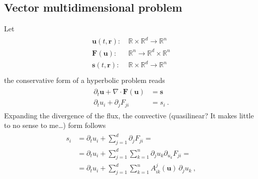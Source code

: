 \documentclass[letterpaper,10pt,english]{jupyterBook}
\begin{document}
\subsection{Vector multi\sphinxhyphen{}dimensional problem}
\label{\detokenize{ch/pde/characteristics:vector-multi-dimensional-problem}}
\sphinxAtStartPar
{} 

\sphinxAtStartPar
Let
\begin{equation*}
\begin{split}\begin{aligned}
  \mathbf{u}(t, \mathbf{r}): & \ \mathbb{R} \times \mathbb{R}^d \rightarrow \mathbb{R}^n \\
  \mathbf{F}(   \mathbf{u}): & \ \mathbb{R}^{n} \rightarrow \mathbb{R}^{d} \times \mathbb{R}^n \\
  \mathbf{s}(t, \mathbf{r}): & \ \mathbb{R} \times \mathbb{R}^d \rightarrow \mathbb{R}^n \\
\end{aligned}\end{split}
\end{equation*}
\sphinxAtStartPar
the conservative form of a hyperbolic problem reads
\begin{equation*}
\begin{split}\begin{aligned}
  \partial_t \mathbf{u} + \nabla \cdot \mathbf{F}(\mathbf{u}) & = \mathbf{s} \\
  \partial_t u_i + \partial_j F_{ji} & = s_i \ .
\end{aligned}\end{split}
\end{equation*}
\sphinxAtStartPar
Expanding the divergence of the flux, the convective (quasi\sphinxhyphen{}linear? It makes little to no sense to me…) form follows
\begin{equation*}
\begin{split}\begin{aligned}
  s_i 
  & = \partial_t u_i + \sum_{j=1}^{d} \partial_j F_{ji} = \\
  & = \partial_t u_i + \sum_{j=1}^{d} \sum_{k=1}^{n} \partial_j u_k \partial_{u_k} F_{ji} = \\
  & = \partial_t u_i + \sum_{j=1}^{d} \sum_{k=1}^{n} A^{j}_{ik}(\mathbf{u}) \, \partial_j u_k  \ ,
\end{aligned}\end{split}
\end{equation*}
\end{document}
